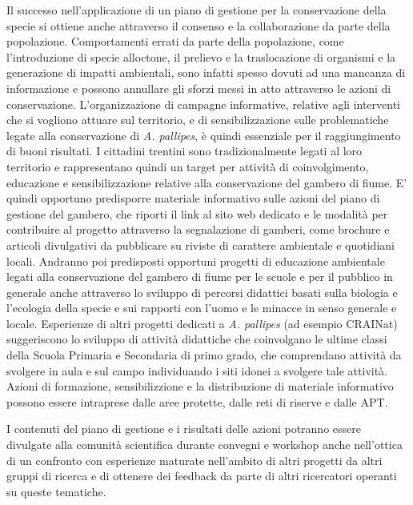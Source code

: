 \documentclass[11pt,a4paper,italian,twoside,openany]{memoir}
\begin{document}
Il successo nell'applicazione di un piano di gestione per la conservazione della specie si ottiene anche attraverso il consenso e la collaborazione da parte della popolazione. Comportamenti errati da parte della popolazione, come l'introduzione di specie alloctone, il prelievo e la traslocazione di organismi e la generazione di impatti ambientali, sono infatti spesso dovuti ad una mancanza di informazione e possono annullare gli sforzi messi in atto attraverso le azioni di conservazione. L'organizzazione di campagne informative, relative agli interventi che si vogliono attuare sul territorio, e di sensibilizzazione sulle problematiche legate alla conservazione di \emph{A. pallipes}, è quindi essenziale per il raggiungimento di buoni risultati. I cittadini trentini sono tradizionalmente legati al loro territorio e rappresentano quindi un target per attività di coinvolgimento, educazione e sensibilizzazione relative alla conservazione del gambero di fiume. E' quindi opportuno predisporre materiale informativo sulle azioni del piano di gestione del gambero, che riporti il link al sito web dedicato e le modalità per contribuire al progetto attraverso la segnalazione di gamberi, come brochure e articoli divulgativi da pubblicare su riviste di carattere ambientale e quotidiani locali. Andranno poi predisposti opportuni progetti di educazione ambientale legati alla conservazione del gambero di fiume per le scuole e per il pubblico in generale anche attraverso lo sviluppo di percorsi didattici basati sulla biologia e l'ecologia della specie e sui rapporti con l'uomo e le minacce in senso generale e locale. Esperienze di altri progetti dedicati a \emph{A. pallipes} (ad esempio CRAINat) suggeriscono lo sviluppo di attività didattiche che coinvolgano le ultime classi della Scuola Primaria e Secondaria di primo grado, che comprendano attività da svolgere in aula e sul campo individuando i siti idonei a svolgere tale attività. Azioni di formazione, sensibilizzione e la distribuzione di materiale informativo possono essere intraprese dalle aree protette, dalle reti di riserve e dalle APT.

I contenuti del piano di gestione e i risultati delle azioni potranno essere divulgate alla comunità scientifica durante convegni e workshop anche nell'ottica di un confronto con esperienze maturate nell'ambito di altri progetti da altri gruppi di ricerca e di ottenere dei feedback da parte di altri ricercatori operanti su queste tematiche.
\end{document}
